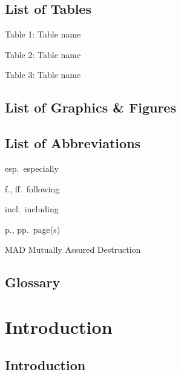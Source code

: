 \documentclass[
  letterpaper,
]{book}
\begin{document}

\section*{List of Tables}\label{list-of-tables}


Table 1: Table name

Table 2: Table name

Table 3: Table name

\section*{List of Graphics \& Figures}\label{list-of-graphics-figures}


\section*{List of Abbreviations}\label{list-of-abbreviations}


esp.~especially

f., ff.~following

incl.~including

p., pp.~page(s)

MAD Mutually Assured Destruction

\section*{Glossary}\label{glossary}



\chapter{Introduction}\label{introduction}

\section{Introduction}\label{introduction-1}
\end{document}

